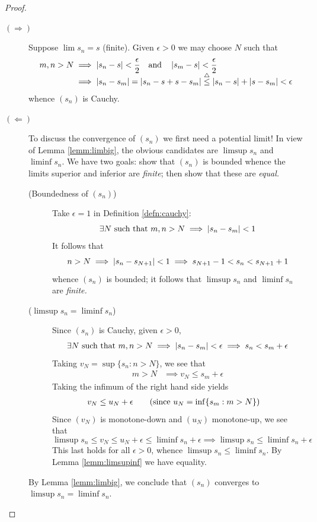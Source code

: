 \begin{proof}
	\begin{description}
		\item[$(\Rightarrow)$] Suppose $\lim s_n=s$ (finite). Given $\epsilon>0$ we may choose $N$ such that
		\begin{align*}
			m,n>N&\implies \left| s_n-s\right|<\frac\epsilon 2\quad\text{and}\quad\left| s_m-s\right|<\frac\epsilon 2\\
			&\implies\left| s_n-s_m\right|=\left| s_n-s+s-s_m\right|\overset{\smash{\triangle}}{\le}\left| s_n-s\right|+\left| s-s_m\right|<\epsilon
		\end{align*}
		whence $(s_n)$ is Cauchy.
		
		\item[$(\Leftarrow)$] To discuss the convergence of $(s_n)$ we first need a potential limit! In view of Lemma \ref{lemm:limbig}, the obvious candidates are $\limsup s_n$ and $\liminf s_n$. We have two goals: show that $(s_n)$ is bounded whence the limits superior and inferior are \emph{finite}; then show that these are \emph{equal.}
		\begin{description}
			\item[\normalfont(Boundedness of $(s_n)$)] Take $\epsilon=1$ in Definition \ref{defn:cauchy}:
			\[\exists N\text{ such that }m,n>N\implies\left| s_n-s_m\right|<1\]
			It follows that
			\[n>N\implies\left| s_n-s_{N+1}\right|<1\implies s_{N+1}-1<s_n<s_{N+1}+1\]
			whence $(s_n)$ is bounded; it follows that $\limsup s_n$ and $\liminf s_n$ are \emph{finite.}
			
			\goodbreak
			
			\item[\normalfont($\limsup s_n=\liminf s_n$)] Since $(s_n)$ is Cauchy, given $\epsilon>0$,
			\[\exists N\text{ such that }m,n>N\implies \left| s_n-s_m\right|<\epsilon\implies s_n<s_m+\epsilon\]
			Taking $v_N=\sup\{s_n:n>N\}$, we see that
			\begin{align*}
				m>N&\implies v_N\le s_m+\epsilon %
			\end{align*}
			Taking the infimum of the right hand side yields
			\begin{align*}
				&v_N\le u_N+\epsilon \tag{since $u_N=\inf\{s_m:m>N\}$}
			\end{align*}
			Since $(v_N)$ is monotone-down and $(u_N)$ monotone-up, we see that
			\[\limsup s_n\le v_N\le u_N+\epsilon\le\liminf s_n+\epsilon \implies \limsup s_n\le \liminf s_n+\epsilon \]
			This last holds for all $\epsilon>0$, whence $\limsup s_n\le \liminf s_n$. By Lemma \ref{lemm:limsupinf} we have equality.
		\end{description}

	By Lemma \ref{lemm:limbig}, we conclude that $(s_n)$ converges to $\limsup s_n=\liminf s_n$.\hfill\qedhere
\end{description}
\end{proof}


